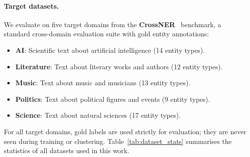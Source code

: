 \documentclass[14pt]{extreport}
\begin{document}
\paragraph{Target datasets.}
We evaluate on five target domains from the \textbf{CrossNER}~\cite{liu-etal-2021-crossner} benchmark, a standard cross-domain evaluation suite with gold entity annotations:
\begin{itemize}
    \item \textbf{AI}: Scientific text about artificial intelligence (14 entity types).
    \item \textbf{Literature}: Text about literary works and authors (12 entity types).
    \item \textbf{Music}: Text about music and musicians (13 entity types).
    \item \textbf{Politics}: Text about political figures and events (9 entity types).
    \item \textbf{Science}: Text about natural sciences (17 entity types).
\end{itemize}
For all target domains, gold labels are used strictly for evaluation; they are never seen during training or clustering.
Table~\ref{tab:dataset_stats} summarises the statistics of all datasets used in this work.

\begin{table}[ht]
\centering
\footnotesize
\caption{Dataset statistics. \#Train / \#Dev / \#Test denote the number of sentences (CoNLL-2003) or documents (CrossNER). \#Types is the number of gold entity type labels. ``---'' denotes a split that is not used.}
\label{tab:dataset_stats}
\end{table}
\end{document}
